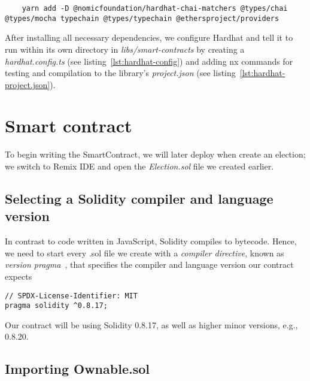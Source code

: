 \begin{verbatim}
    yarn add -D @nomicfoundation/hardhat-chai-matchers @types/chai @types/mocha typechain @types/typechain @ethersproject/providers
\end{verbatim}

After installing all necessary dependencies, we configure Hardhat and tell it to run within its own directory in \emph{libs/smart-contracts} by creating a \emph{hardhat.config.ts} (see listing~\ref{lst:hardhat-config}) and adding nx commands for testing and compilation to the library's \emph{project.json} (see listing~\ref{lst:hardhat-project.json}).


\section{Smart contract}\label{sec:smart-contract}

To begin writing the \gls{SmartContract}, we will later deploy when  create an election; we switch to Remix \gls{IDE} and open the \emph{Election.sol} file we created earlier.

\subsection{Selecting a Solidity compiler and language version}\label{subsec:selecting-a-solidity-compiler-and-language-version}

In contrast to code written in JavaScript, Solidity compiles to bytecode.
Hence, we need to start every .sol file we create with a \emph{compiler directive}, known as \emph{version pragma}~\autocite[135]{antonopoulos_mastering_2019}, that specifies the compiler and language version our contract expects

\begin{verbatim}
// SPDX-License-Identifier: MIT
pragma solidity ^0.8.17;
\end{verbatim}

Our contract will be using Solidity 0.8.17, as well as higher minor versions, e.g., 0.8.20.

\subsection{Importing Ownable.sol}\label{subsec:impotring-ownable.sol}

